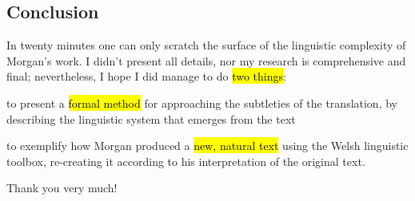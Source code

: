 \begin{paper}
	\section{Conclusion}

	In twenty minutes one can only scratch the surface of the linguistic complexity of Morgan’s work. I didn’t present all details, nor my research is comprehensive and final; nevertheless, I hope I did manage to do \hl{two things}:
	\begin{compactitem}
		\item to present a \hl{formal method} for approaching the subtleties of the translation, by describing the linguistic system that emerges from the text
		\item to exemplify how Morgan produced a \hl{new, natural text} using the Welsh linguistic toolbox, re-creating it according to his interpretation of the original text.
	\end{compactitem}

	Thank you very much!
\end{paper}
